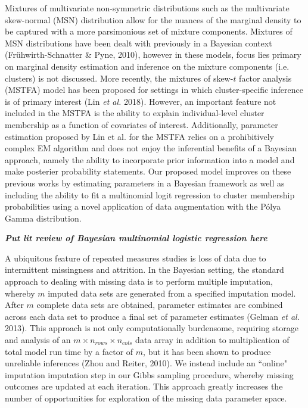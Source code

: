 \documentclass[useAMS,referee]{biom}
\begin{document}
Mixtures of multivariate non-symmetric distributions such as the multivariate skew-normal (MSN) distribution allow for the nuances of the marginal density to be captured with a more parsimonious set of mixture components. Mixtures of MSN distributions have been dealt with previously in a Bayesian context (Fr\"{u}hwirth-Schnatter \& Pyne, 2010), however in these models, focus lies primary on marginal density estimation and inference on the mixture components (i.e. clusters) is not discussed. More recently, the mixtures of skew-$t$ factor analysis (MSTFA) model has been proposed for settings in which cluster-specific inference is of primary interest (Lin \textit{et al.} 2018). However, an important feature not included in the MSTFA is the ability to explain individual-level cluster membership as a function of covariates of interest. Additionally, parameter estimation proposed by Lin et al. for the MSTFA relies on a prohibitively complex EM algorithm and does not enjoy the inferential benefits of a Bayesian approach, namely the ability to incorporate prior information into a model and make posterier probability statements. Our proposed model improves on these previous works by estimating parameters in a Bayesian framework as well as including the ability to fit a multinomial logit regression to cluster membership probabilities using a novel application of data augmentation with the P\'olya Gamma distribution.

\textbf{\textit{Put lit review of Bayesian multinomial logistic regression here}}

A ubiquitous feature of repeated measures studies is loss of data due to intermittent missingness and attrition. In the Bayesian setting, the standard approach to dealing with missing data is to perform multiple imputation, whereby $m$ imputed data sets are generated from a specified imputation model. After $m$ complete data sets are obtained, parameter estimates are combined across each data set to produce a final set of parameter estimates (Gelman \textit{et al.} 2013). This approach is not only computationally burdensome, requiring storage and analysis of an $m \times n_{rows} \times n_{cols}$ data array in addition to multiplication of total model run time by a factor of $m$, but it has been shown to produce unreliable inferences (Zhou and Reiter, 2010). We instead include an ``online" imputation imputation step in our Gibbs sampling procedure, whereby missing outcomes are updated at each iteration. This approach greatly increases the number of opportunities for exploration of the missing data parameter space.
\end{document}
